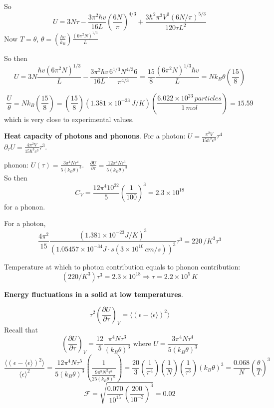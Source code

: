 So 
\[
U = 3 N \tau - \frac{3 \pi^2 \hbar v}{ 16 L} \left( \frac{6N }{\pi} \right)^{4/3} + \frac{ 3\hbar^2 \pi^3 V^2 ( 6 N/\pi)^{5/3} }{ 120 \tau L^2 }
\]
Now $T = \theta$, $\theta = \left( \frac{ \hbar v }{k_B} \right) \frac{ (6\pi^2 N )^{1/3} }{L}$

So then 
\[
U = 3 N \frac{ \hbar v (6\pi^2 N)^{1/3} }{ L } - \frac{3\pi^2 \hbar v }{16 L } \frac{ 6^{1/3} N^{4/3} 6 }{ \pi^{4/3} } = \frac{15}{8} \frac{ (6\pi^2 N)^{1/3} \hbar v}{L}  = N k_B \theta \left( \frac{15}{8} \right)
\]

\[
\frac{U}{\theta} = N k_B \left( \frac{15}{8} \right) = \left( \frac{15}{8} \right) (1.381 \times 10^{-23} \, J/K) \left( \frac{6.022 \times 10^{23} \, particles }{ 1 \, mol } \right) = 15.59
\]
which is very close to experimental values.  




 \textbf{Heat capacity of photons and phonons}.  For a photon: $U = \frac{ \pi^2 V}{ 15 \hbar^3 c^3 } \tau^4$ \quad \, 
$\partial_{\tau} U = \frac{4\pi^2 V}{15 \hbar^3 c^3 } \tau^3 $. 

phonon: $U(\tau) = \frac{3\pi^4 N \tau^4 }{ 5 (k_B \theta)^3 }$.  \quad \, 
$\frac{\partial U}{ \partial \tau} = \frac{12 \pi^4 N \tau^3 }{ 5 (k_B \theta)^3 }$ \\
So then
\[
C_V = \frac{12 \pi^4 10^{22} }{5} \left( \frac{1}{100} \right)^3  = 2.3 \times 10^{18}  
\]
for a phonon.  

For a photon, 
\[
\frac{4\pi^2 }{15} \frac{ (1.381 \times 10^{-23} J/K )^3 }{ (1.05457 \times 10^{-34} J\cdot s (3\times 10^{10} \, cm/s))^3 } \tau^3 = 220 \, /K^3 \tau^3
\]

Temperature at which to photon contribution equals to phonon contribution:
\[
 (220 /K^3 )\tau^3 = 2.3 \times 10^{18 } \Longrightarrow \boxed{ \tau = 2.2 \times 10^{5} \, K}
\]








 \textbf{Energy fluctuations in a solid at low temperatures}.  

\[
\tau^2 \left( \frac{ \partial U}{ \partial \tau} \right)_V = \langle (\epsilon - \langle \epsilon \rangle )^2 \rangle
\]
Recall that 
\[
\left( \frac{ \partial U}{\partial \tau} \right)_V = \frac{12}{5} \frac{\pi^4  N \tau^3 }{ ( k_B \theta)^3 } \text{ where } U = \frac{3 \pi^4 N \tau^4 }{ 5 (k_B \theta)^3 }
\]
\[
\frac{ \langle (\epsilon - \langle \epsilon \rangle )^2 \rangle }{ \langle \epsilon \rangle^2 }= \frac{ 12 \pi^4 N \tau^5 }{ 5 (k_B \theta)^3 } \left( \frac{1}{ \frac{ 9 \pi^8 N^2 \tau^8 }{ 25 (k_B \theta)^6 } } \right) = \frac{ 20 }{3} \left( \frac{1}{\pi^4 } \right) \left( \frac{1}{N} \right)\left( \frac{1}{\tau^3 } \right) (k_B \theta)^3  = \frac{ 0.068 }{N} \left( \frac{ \theta }{T}\right)^3 
\]
\[
\mathcal{F} = \sqrt{ \frac{ 0.070 }{10^{15}} \left( \frac{200}{10^{-2} } \right)^3  } = 0.02
\]




